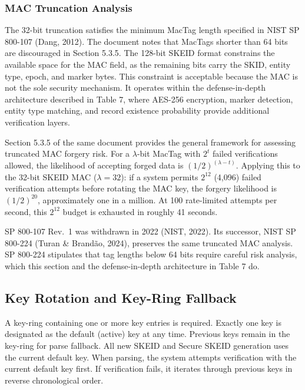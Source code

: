 \documentclass[fleqn,10pt]{wlpeerj}
\begin{document}
\subsubsection{MAC Truncation Analysis}\label{mac-truncation-analysis}

The 32-bit truncation satisfies the minimum MacTag length specified in
NIST SP 800-107 (Dang, 2012). The document notes that MacTags shorter
than 64 bits are discouraged in Section 5.3.5. The 128-bit SKEID format
constrains the available space for the MAC field, as the remaining bits
carry the SKID, entity type, epoch, and marker bytes. This constraint is
acceptable because the MAC is not the sole security mechanism. It
operates within the defense-in-depth architecture described in Table 7,
where AES-256 encryption, marker detection, entity type matching, and
record existence probability provide additional verification layers.

Section 5.3.5 of the same document provides the general framework for
assessing truncated MAC forgery risk. For a \(\lambda\)-bit MacTag with
\(2^t\) failed verifications allowed, the likelihood of accepting forged
data is \((1/2)^{(\lambda - t)}\). Applying this to the 32-bit SKEID MAC
(\(\lambda = 32\)): if a system permits \(2^{12}\) (4,096) failed
verification attempts before rotating the MAC key, the forgery
likelihood is \((1/2)^{20}\), approximately one in a million. At 100
rate-limited attempts per second, this \(2^{12}\) budget is exhausted in
roughly 41 seconds.

SP 800-107 Rev.~1 was withdrawn in 2022 (NIST, 2022). Its successor,
NIST SP 800-224 (Turan \& Brandão, 2024), preserves the same truncated
MAC analysis. SP 800-224 stipulates that tag lengths below 64 bits
require careful risk analysis, which this section and the
defense-in-depth architecture in Table 7 do.

\subsection{Key Rotation and Key-Ring
Fallback}\label{key-rotation-and-key-ring-fallback}

A key-ring containing one or more key entries is required. Exactly one
key is designated as the default (active) key at any time. Previous keys
remain in the key-ring for parse fallback. All new SKEID and Secure
SKEID generation uses the current default key. When parsing, the system
attempts verification with the current default key first. If
verification fails, it iterates through previous keys in reverse
chronological order.
\end{document}
